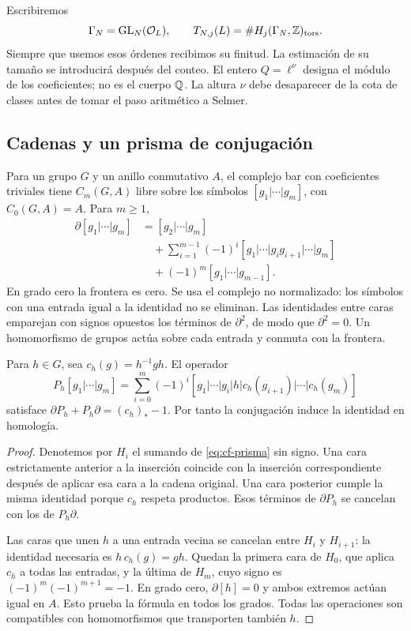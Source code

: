 Escribiremos
\[
 \Gamma_N=\operatorname{GL}_N(\mathcal O_L),\qquad
 T_{N,j}(L)=\#H_j(\Gamma_N,\mathbb{Z})_{\mathrm{tors}}.
\]
Siempre que usemos esos órdenes recibimos su finitud. La estimación
de su tamaño se introducirá después del conteo. El entero
$Q=\ell^\nu$ designa el módulo de los coeficientes; no es el cuerpo
$\mathbb{Q}$. La altura $\nu$ debe desaparecer de la cota de clases antes
de tomar el paso aritmético a Selmer.

\subsection{Cadenas y un prisma de conjugación}

Para un grupo $G$ y un anillo conmutativo $A$, el complejo bar
con coeficientes triviales tiene $C_m(G,A)$ libre sobre los símbolos
$[g_1|\cdots|g_m]$, con $C_0(G,A)=A$. Para $m\ge1$,
\begin{equation}
 \begin{aligned}
 \partial[g_1|\cdots|g_m]
 &=[g_2|\cdots|g_m]\\
 &\quad+\sum_{i=1}^{m-1}(-1)^i
 [g_1|\cdots|g_ig_{i+1}|\cdots|g_m]\\
 &\quad+(-1)^m[g_1|\cdots|g_{m-1}].
 \end{aligned}
 \label{eq:cf-bar}
\end{equation}
En grado cero la frontera es cero. Se usa el complejo no normalizado:
los símbolos con una entrada igual a la identidad no se eliminan.
Las identidades entre caras emparejan con signos opuestos los
términos de $\partial^2$, de modo que $\partial^2=0$.
Un homomorfismo de grupos actúa sobre cada entrada y conmuta con
la frontera.

\begin{lema}
\label{lem:cf-prisma}
Para $h\in G$, sea $c_h(g)=h^{-1}gh$. El operador
\begin{equation}
 P_h[g_1|\cdots|g_m]
 =\sum_{i=0}^{m}(-1)^i
 [g_1|\cdots|g_i|h|c_h(g_{i+1})|\cdots|c_h(g_m)]
 \label{eq:cf-prisma}
\end{equation}
satisface $\partial P_h+P_h\partial=(c_h)_*-1$.
Por tanto la conjugación induce la identidad en homología.
\end{lema}

\begin{proof}
Denotemos por $H_i$ el sumando de \eqref{eq:cf-prisma} sin signo.
Una cara estrictamente anterior a la inserción coincide con la
inserción correspondiente después de aplicar esa cara a la cadena
original. Una cara posterior cumple la misma identidad porque
$c_h$ respeta productos. Esos términos de $\partial P_h$ se
cancelan con los de $P_h\partial$.

Las caras que unen $h$ a una entrada vecina se cancelan entre
$H_i$ y $H_{i+1}$: la identidad necesaria es
$h\,c_h(g)=gh$. Quedan la primera cara de $H_0$, que aplica
$c_h$ a todas las entradas, y la última de $H_m$, cuyo signo es
$(-1)^m(-1)^{m+1}=-1$. En grado cero,
$\partial[h]=0$ y ambos extremos actúan igual en $A$.
Esto prueba la fórmula en todos los grados. Todas las operaciones
son compatibles con homomorfismos que transporten también $h$.
\end{proof}

